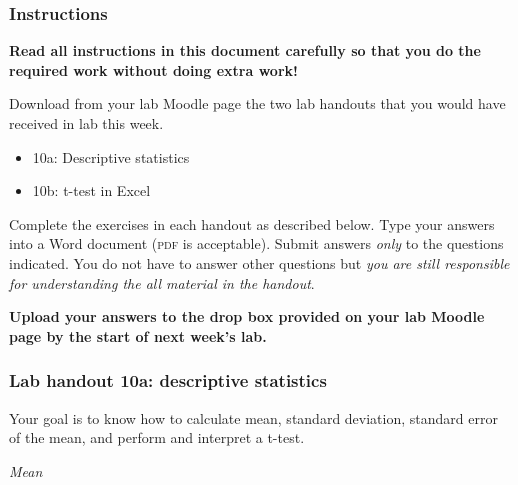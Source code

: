 \documentclass[12pt]{exam}
\begin{document}
\subsubsection*{Instructions}

\textbf{Read all instructions in this document carefully so that you do the required work without doing extra work!}

Download from your lab Moodle page the two lab handouts that you would have received in lab this week. 

\begin{itemize}
\item 10a: Descriptive statistics
\item 10b: t-test in Excel
\end{itemize}

Complete the exercises in each handout as described below. Type your answers into a Word document (\textsc{pdf} is acceptable). Submit answers \emph{only} to the questions indicated. You do not have to answer other questions but \emph{you are still responsible for understanding the all material in the handout}.

\textbf{Upload your answers to the drop box provided on your lab Moodle page by the start of next week's lab.}


\subsubsection*{Lab handout 10a: descriptive statistics}

Your goal is to know how to calculate mean, standard deviation, standard error of the mean, and perform and interpret a t-test.


\emph{Mean}
\end{document}
